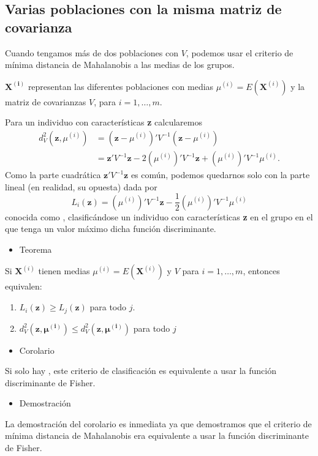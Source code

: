 \subsection{Varias poblaciones con la misma matriz de covarianza}
Cuando tengamos más de dos poblaciones con  $V$, podemos usar el criterio de mínima distancia de Mahalanobis a las medias de los grupos.

$\mathbf{X^{(i)}}$ representan las diferentes poblaciones con medias $\mu^{(i)}=E(\mathbf{X}^{(i)})$ y la matriz de covarianzas $V$, para $i=1,\dots,m$.

Para un individuo con características \textbf{z} calcularemos \[ \begin{aligned}
d_V^2(\mathbf{z},\mu^{(i)})&=(\mathbf{z}-\mu^{(i)})'V^{-1}(\mathbf{z}-\mu^{(i)})\\
&=\mathbf{z'}V^{-1}\mathbf{z}-2(\mu^{(i)})'V^{-1}\mathbf{z}+(\mu^{(i)})'V^{-1}\mu^{(i)}.
\end{aligned} \]
Como la parte cuadrática $\mathbf{z'}V^{-1}\mathbf{z}$ es común, podemos quedarnos solo con la parte lineal (en realidad, su opuesta) dada por \[ L_i(\mathbf{z})=(\mu^{(i)})'V^{-1}\mathbf{z}-\dfrac{1}{2}(\mu^{(i)})'V^{-1}\mu^{(i)} \]conocida como , clasificándose un individuo con características \textbf{z} en el grupo en el que tenga un valor máximo dicha función discriminante.

\begin{itemize}[label=\color{red}\textbullet, leftmargin=*]
	\item \color{lightblue}Teorema
\end{itemize}
Si $\mathbf{X}^{(i)}$ tienen medias $\mu^{(i)}=E(\mathbf{X}^{(i)})$ y  $V$ para $i=1,\dots,m$, entonces equivalen:
\begin{enumerate}[label=\color{lightblue}\arabic*)]
	\item $L_i(\mathbf{z})\ge L_j(\mathbf{z})$ para todo $j$.
\item $d_V^2(\mathbf{z,\mu^{(i)}})\le d_V^2(\mathbf{z,\mu^{(i)}})$ para todo $j$
\end{enumerate}
\begin{itemize}[label=\color{red}\textbullet, leftmargin=*]
	\item \color{lightblue}Corolario
\end{itemize}
Si solo hay , este criterio de clasificación es equivalente a usar la función discriminante de Fisher.
\begin{itemize}[label=\color{red}\textbullet, leftmargin=*]
	\item \color{lightblue}Demostración
\end{itemize}
La demostración del corolario es inmediata ya que demostramos que el criterio de mínima distancia de Mahalanobis era equivalente a usar la función discriminante de Fisher.

